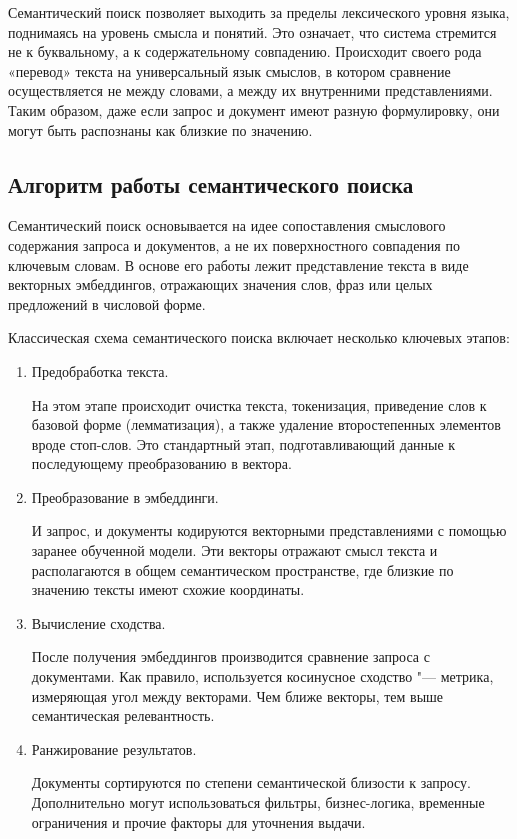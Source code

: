\documentclass[coursework]{SCWorks}
\begin{document}
Семантический поиск позволяет выходить за пределы лексического уровня языка, поднимаясь на уровень смысла и понятий. Это означает, что система стремится не к буквальному, а к содержательному совпадению. Происходит своего рода «перевод» текста на универсальный язык смыслов, в котором сравнение осуществляется не между словами, а между их внутренними представлениями. Таким образом, даже если запрос и документ имеют разную формулировку, они могут быть распознаны как близкие по значению.

\subsection{Алгоритм работы семантического поиска}
Семантический поиск основывается на идее сопоставления смыслового содержания запроса и документов, а не их поверхностного совпадения по ключевым словам. В основе его работы лежит представление текста в виде векторных эмбеддингов, отражающих значения слов, фраз или целых предложений в числовой форме.

Классическая схема семантического поиска включает несколько ключевых этапов:
\begin{enumerate}
    \item Предобработка текста.
    
На этом этапе происходит очистка текста, токенизация, приведение слов к базовой форме (лемматизация), а также удаление второстепенных элементов вроде стоп-слов. Это стандартный этап, подготавливающий данные к последующему преобразованию в вектора.

    \item Преобразование в эмбеддинги.
    
И запрос, и документы кодируются векторными представлениями с помощью заранее обученной модели. Эти векторы отражают смысл текста и располагаются в общем семантическом пространстве, где близкие по значению тексты имеют схожие координаты.

    \item Вычисление сходства.
    
После получения эмбеддингов производится сравнение запроса с документами. Как правило, используется косинусное сходство "--- метрика, измеряющая угол между векторами. Чем ближе векторы, тем выше семантическая релевантность.

    \item Ранжирование результатов.
    
Документы сортируются по степени семантической близости к запросу. Дополнительно могут использоваться фильтры, бизнес-логика, временные ограничения и прочие факторы для уточнения выдачи.
\end{enumerate}
\end{document}
